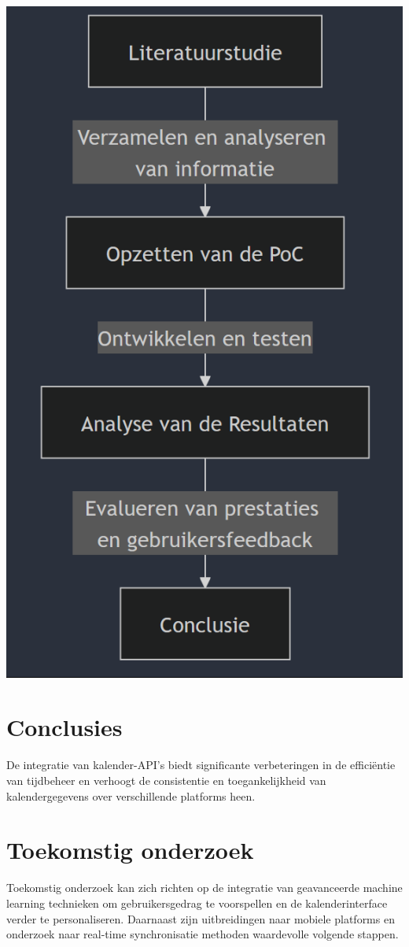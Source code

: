 \documentclass[a0,portrait]{hogent-poster}
\begin{document}
\begin{multicols}{2}
        \begin{center}
            \captionsetup{type=figure}
            \includegraphics[width=0.3\linewidth]{flowchart}
        \end{center}
        
        \section{Conclusies}
        De integratie van kalender-API's biedt significante verbeteringen in de efficiëntie van tijdbeheer en verhoogt de consistentie en toegankelijkheid van kalendergegevens over verschillende platforms heen.
        
        \section{Toekomstig onderzoek}
        Toekomstig onderzoek kan zich richten op de integratie van geavanceerde machine learning technieken om gebruikersgedrag te voorspellen en de kalenderinterface verder te personaliseren. Daarnaast zijn uitbreidingen naar mobiele platforms en onderzoek naar real-time synchronisatie methoden waardevolle volgende stappen.
        
    \end{multicols}
\end{document}

